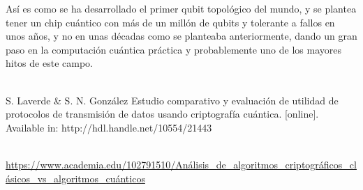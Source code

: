 \documentclass[12pt]{article}
\numberwithin{equation}{section} %
\begin{document}
    Así es como se ha desarrollado el primer qubit topológico del mundo, y se plantea tener un chip cuántico con más de un millón de qubits y tolerante a fallos en unos años, y no en unas décadas como se planteaba anteriormente, dando un gran paso en la computación cuántica práctica y probablemente uno de los mayores hitos de este campo.





    \newpage
    \thispagestyle{empty}
    \mbox{}
    
    \nocite{*} %

    \\

    S. Laverde & S. N. González Estudio comparativo y evaluación de utilidad de protocolos de transmisión de datos usando criptografía cuántica. [online]. Available in: http://hdl.handle.net/10554/21443

    \\

    \url{https://www.academia.edu/102791510/Análisis_de_algoritmos_criptográficos_clásicos_vs_algoritmos_cuánticos}
\end{document}
